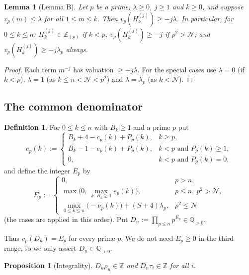 \documentclass[11pt]{amsart}
\newtheorem{proposition}[theorem]{Proposition}
\newtheorem{lemma}[theorem]{Lemma}
\theoremstyle{definition}
\newtheorem{definition}[theorem]{Definition}
\theoremstyle{remark}
\numberwithin{equation}{section}
\newcommand{\ZZ}{\mathbb{Z}}
\newcommand{\QQ}{\mathbb{Q}}
\newcommand{\cN}{\mathcal{N}}
\begin{document}
\begin{lemma}[Lemma B]\label{lem:B}
Let $p$ be a prime, $\lambda\ge0$, $j\ge1$ and $k\ge0$, and suppose $v_p(m)\le\lambda$ for all $1\le m\le k$. Then
$v_p(H_k^{(j)})\ge -j\lambda$. In particular, for $0\le k\le n$: $H_k^{(j)}\in\ZZ_{(p)}$ if $k<p$;
$v_p(H_k^{(j)})\ge -j$ if $p^2>\cN$; and $v_p(H_k^{(j)})\ge-j\lambda_p$ always.
\end{lemma}

\begin{proof}
Each term $m^{-j}$ has valuation $\ge-j\lambda$. For the special cases use $\lambda=0$ (if $k<p$), $\lambda=1$
(as $k\le n<\cN<p^2$) and $\lambda=\lambda_p$ (as $k<\cN$).
\end{proof}

\subsection{The common denominator}

\begin{definition}\label{def:Ep}
For $0\le k\le n$ with $B_k\ge1$ and a prime $p$ put
\[
  e_p(k):=\begin{cases}
  B_k+4-c_p(k)+P_p(k), & k\ge p,\\
  B_k-1-c_p(k)+P_p(k), & k<p \text{ and } P_p(k)\ge1,\\
  0, & k<p \text{ and } P_p(k)=0,
  \end{cases}
\]
and define the integer $E_p$ by
\[
  E_p:=\begin{cases}
  0, & p>n,\\
  \max\bigl(0,\ \max_{k:\,B_k\ge1}e_p(k)\bigr), & p\le n,\ p^2>\cN,\\
  \max_{0\le k\le n}\bigl(-\nu_p(k)\bigr)+(S+4)\lambda_p, & p^2\le \cN
  \end{cases}
\]
(the cases are applied in this order). Put $D_n:=\prod_{p\le n}p^{E_p}\in\QQ_{>0}$.
\end{definition}

Thus $v_p(D_n)=E_p$ for every prime $p$. We do not need $E_p\ge0$ in the third range, so we only assert
$D_n\in\QQ_{>0}$.

\begin{proposition}[Integrality]\label{prop:integral}
$D_n\rho_n\in\ZZ$ and $D_n\tau_i\in\ZZ$ for all $i$.
\end{proposition}
\end{document}
